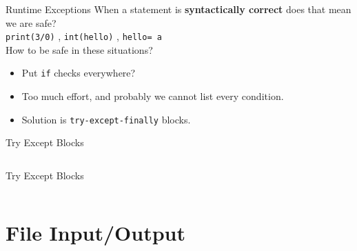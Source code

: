     \begin{frame}{Runtime Exceptions}
        \LARGE
        When a statement is \textbf{syntactically correct} does that mean we are safe?\\
        \pause
        \texttt{print(3/0)}
        \pause
        , \texttt{int(\textquotesingle hello\textquotesingle)}
        \pause
        , \texttt{\textquotesingle hello\textquotesingle [2] = \textquotesingle a\textquotesingle }\\
        \pause
        How to be safe in these situations?
        \begin{itemize}
            \pause
            \item Put \texttt{if} checks everywhere?
            \pause
            \item Too much effort, and probably we cannot list every condition.
            \pause
            \item Solution is \texttt{try-except-finally} blocks.
        \end{itemize}
    \end{frame}

    \begin{frame}{Try Except Blocks}
        \inputminted[frame=single, framesep=2pt]{python3}{code-examples/try_except_finally.py}
    \end{frame}

    \begin{frame}{Try Except Blocks}
        \LARGE
        \inputminted[frame=single, framesep=2pt,
        lastline=9]{python3}{code-examples/try_except.py}
    \end{frame}



    \section{File Input/Output}

